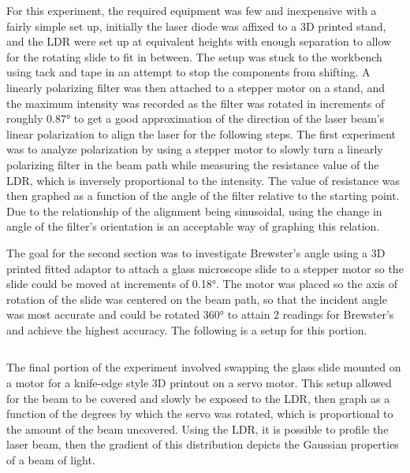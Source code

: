 \documentclass[11pt]{article}
\makeatletter
\newcommand{\boxspacing}{\kern\kvtcb@left@rule\kern\kvtcb@boxsep}
\newcommand{\prompt}[4]{
        {\ttfamily\llap{{\color{#2}[#3]:\hspace{3pt}#4}}\vspace{-\baselineskip}}
    }
\makeatother
\begin{document}
    For this experiment, the required equipment was few and inexpensive with
a fairly simple set up, initially the laser diode was affixed to a 3D
printed stand, and the LDR were set up at equivalent heights with enough
separation to allow for the rotating slide to fit in between. The setup
was stuck to the workbench using tack and tape in an attempt to stop the
components from shifting. A linearly polarizing filter was then attached
to a stepper motor on a stand, and the maximum intensity was recorded as
the filter was rotated in increments of roughly 0.87° to get a good
approximation of the direction of the laser beam's linear polarization
to align the laser for the following steps. The first experiment was to
analyze polarization by using a stepper motor to slowly turn a linearly
polarizing filter in the beam path while measuring the resistance value
of the LDR, which is inversely proportional to the intensity. The value
of resistance was then graphed as a function of the angle of the filter
relative to the starting point. Due to the relationship of the alignment
being sinusoidal, using the change in angle of the filter's orientation
is an acceptable way of graphing this relation.

The goal for the second section was to investigate Brewster's angle
using a 3D printed fitted adaptor to attach a glass microscope slide to
a stepper motor so the slide could be moved at increments of 0.18°. The
motor was placed so the axis of rotation of the slide was centered on
the beam path, so that the incident angle was most accurate and could be
rotated 360° to attain 2 readings for Brewster's and achieve the highest
accuracy. The following is a setup for this portion.

    \begin{tcolorbox}[breakable, size=fbox, boxrule=1pt, pad at break*=1mm,colback=cellbackground, colframe=cellborder]
\prompt{In}{incolor}{ }{\boxspacing}
\begin{Verbatim}[commandchars=\\\{\}]

\end{Verbatim}
\end{tcolorbox}

    The final portion of the experiment involved swapping the glass slide
mounted on a motor for a knife-edge style 3D printout on a servo motor.
This setup allowed for the beam to be covered and slowly be exposed to
the LDR, then graph as a function of the degrees by which the servo was
rotated, which is proportional to the amount of the beam uncovered.
Using the LDR, it is possible to profile the laser beam, then the
gradient of this distribution depicts the Gaussian properties of a beam
of light.
\end{document}
